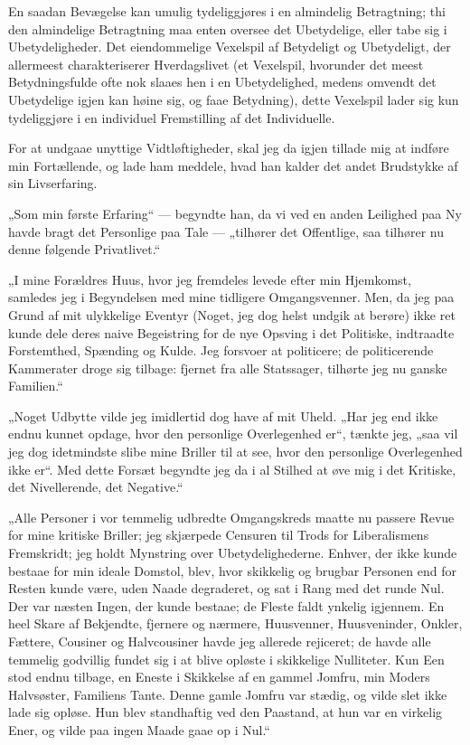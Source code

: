 \documentclass[12pt,a4paper]{book}
\newcommand{\apage}[1]{\marginnote{\footnotesize\textit{[#1]}}}
\begin{document}
En saadan Bevægelse kan umulig tydeliggjøres i en almindelig Betragtning; thi den almindelige Betragtning maa enten oversee det Ubetydelige, eller tabe sig i Ubetydeligheder. Det eiendommelige Vexelspil af Betydeligt og Ubetydeligt, der allermeest charakteriserer Hverdagslivet (et Vexelspil, hvorunder det meest Betydningsfulde ofte nok slaaes hen i en \apage{69}
Ubetydelighed, medens omvendt det Ubetydelige igjen kan høine sig, og faae Betydning), dette Vexelspil lader sig kun tydeliggjøre i en individuel Fremstilling af det Individuelle.

For at undgaae unyttige Vidtløftigheder, skal jeg da igjen tillade mig at indføre min Fortællende, og lade ham meddele, hvad han kalder det andet Brudstykke af sin Livserfaring.

„Som min første Erfaring“ — begyndte han, da vi ved en anden Leilighed paa Ny havde bragt det Personlige paa Tale — „tilhører det Offentlige, saa tilhører nu denne følgende Privatlivet.“

„I mine Forældres Huus, hvor jeg fremdeles levede efter min Hjemkomst, samledes jeg i Begyndelsen med mine tidligere Omgangsvenner. Men, da jeg paa Grund af mit ulykkelige Eventyr (Noget, jeg dog helst undgik at berøre) ikke ret kunde dele deres naive Begeistring for de nye Opsving i det Politiske, indtraadte Forstemthed, Spænding og Kulde. Jeg forsvoer at politicere; de politicerende Kammerater droge sig tilbage: fjernet fra alle Statssager, tilhørte jeg nu ganske Familien.“

„Noget Udbytte vilde jeg imidlertid dog have af mit Uheld. „Har jeg end ikke endnu kunnet opdage, hvor den personlige Overlegenhed er“, tænkte jeg, „saa vil jeg dog idetmindste slibe mine Briller til at see, hvor den personlige Overlegenhed ikke er“. Med dette Forsæt begyndte jeg da i al Stilhed at øve mig i det Kritiske, det Nivellerende, det Negative.“

„Alle Personer i vor temmelig udbredte Omgangskreds maatte nu passere Revue for mine kritiske Briller; jeg skjærpede Censuren til Trods for Liberalismens Fremskridt; jeg holdt Mynstring over Ubetydelighederne. Enhver, der ikke kunde bestaae for min ideale Domstol, blev, hvor skikkelig og brugbar Personen end for Resten kunde være, uden Naade degraderet, og sat i Rang med det runde Nul. Der var næsten Ingen, der kunde bestaae; de Fleste faldt ynkelig igjennem. En heel Skare af Bekjendte, fjernere og nærmere, \apage{70}
Huusvenner, Huusveninder, Onkler, Fættere, Cousiner og Halvcousiner havde jeg allerede rejiceret; de havde alle temmelig godvillig fundet sig i at blive opløste i skikkelige Nulliteter. Kun Een stod endnu tilbage, en Eneste i Skikkelse af en gammel Jomfru, min Moders Halvsøster, Familiens Tante. Denne gamle Jomfru var stædig, og vilde slet ikke lade sig opløse. Hun blev standhaftig ved den Paastand, at hun var en virkelig Ener, og vilde paa ingen Maade gaae op i Nul.“
\end{document}
